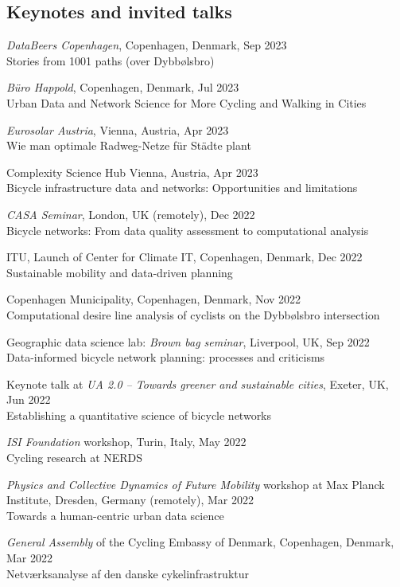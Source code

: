 \documentclass[10pt,a4paper]{article}
\renewenvironment{itemize}{
  \begin{list}{}{
    \setlength{\leftmargin}{1.5em}
    \setlength{\itemsep}{0.25em}
    \setlength{\parskip}{0pt}
    \setlength{\parsep}{0.25em}
  }
}{
  \end{list}
}
\begin{document}
\subsection*{Keynotes and invited talks}
\begin{itemize}
\item{\emph{DataBeers Copenhagen}, Copenhagen, Denmark, Sep 2023\\Stories from 1001 paths (over Dybbølsbro)}
\item{\emph{Büro Happold}, Copenhagen, Denmark, Jul 2023\\Urban Data and Network Science for More Cycling and Walking in Cities}
\item{\emph{Eurosolar Austria}, Vienna, Austria, Apr 2023\\Wie man optimale Radweg-Netze für Städte plant}
\item{Complexity Science Hub Vienna, Austria, Apr 2023\\Bicycle infrastructure data and networks: Opportunities and limitations}
\item{\emph{CASA Seminar}, London, UK (remotely), Dec 2022\\Bicycle networks: From data quality assessment to computational analysis}
\item{ITU, Launch of Center for Climate IT, Copenhagen, Denmark, Dec 2022\\Sustainable mobility and data-driven planning}
\item{Copenhagen Municipality, Copenhagen, Denmark, Nov 2022\\Computational desire line analysis of cyclists on the Dybbølsbro intersection}
\item{Geographic data science lab: \emph{Brown bag seminar}, Liverpool, UK, Sep 2022\\Data-informed bicycle network planning: processes and criticisms}
\item{Keynote talk at \emph{UA 2.0 – Towards greener and sustainable cities}, Exeter, UK, Jun 2022\\Establishing a quantitative science of bicycle networks}
\item{\emph{ISI Foundation} workshop, Turin, Italy, May 2022\\Cycling research at NERDS}
\item{\emph{Physics and Collective Dynamics of Future Mobility} workshop at Max Planck Institute, Dresden, Germany (remotely), Mar 2022\\Towards a human-centric urban data science}
\item{\emph{General Assembly} of the Cycling Embassy of Denmark, Copenhagen, Denmark, Mar 2022\\Netværksanalyse af den danske cykelinfrastruktur}

\end{itemize}
\end{document}

